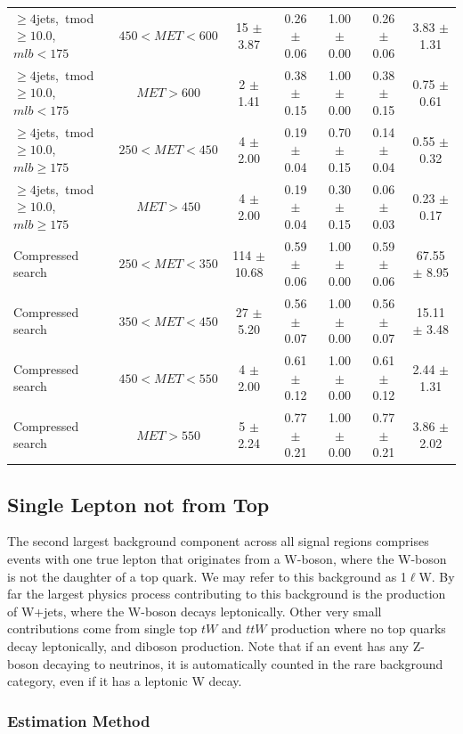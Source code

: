 \begin{table}
\begin{tabular}{|l|c|c|c|c|c|c|}
 $\ge4$jets,~tmod$\ge10.0$,~$mlb<175$ & $450<MET<600$  & 15 $\pm$ 3.87  & 0.26 $\pm$ 0.06  & 1.00 $\pm$ 0.00 & 0.26 $\pm$ 0.06  & 3.83 $\pm$ 1.31  \\
 $\ge4$jets,~tmod$\ge10.0$,~$mlb<175$ & $MET>600$  & 2 $\pm$ 1.41  & 0.38 $\pm$ 0.15  & 1.00 $\pm$ 0.00 & 0.38 $\pm$ 0.15  & 0.75 $\pm$ 0.61  \\
\hline
 $\ge4$jets,~tmod$\ge10.0$,~$mlb\ge175$ & $250<MET<450$  & 4 $\pm$ 2.00  & 0.19 $\pm$ 0.04  & 0.70 $\pm$ 0.15 & 0.14 $\pm$ 0.04  & 0.55 $\pm$ 0.32  \\
 $\ge4$jets,~tmod$\ge10.0$,~$mlb\ge175$ & $MET>450$  & 4 $\pm$ 2.00  & 0.19 $\pm$ 0.04  & 0.30 $\pm$ 0.15 & 0.06 $\pm$ 0.03  & 0.23 $\pm$ 0.17  \\
\hline
Compressed search & $250<MET<350$  & 114 $\pm$ 10.68  & 0.59 $\pm$ 0.06 & 1.00 $\pm$ 0.00 & 0.59 $\pm$ 0.06  & 67.55 $\pm$ 8.95  \\
Compressed search & $350<MET<450$  &  27 $\pm$ 5.20   & 0.56 $\pm$ 0.07 & 1.00 $\pm$ 0.00 & 0.56 $\pm$ 0.07  & 15.11 $\pm$ 3.48  \\
Compressed search & $450<MET<550$  &   4 $\pm$ 2.00   & 0.61 $\pm$ 0.12 & 1.00 $\pm$ 0.00 & 0.61 $\pm$ 0.12  &  2.44 $\pm$ 1.31  \\
Compressed search & $MET>550$      &   5 $\pm$ 2.24   & 0.77 $\pm$ 0.21 & 1.00 $\pm$ 0.00 & 0.77 $\pm$ 0.21  &  3.86 $\pm$ 2.02  \\
\hline
\end{tabular}
\end{table}

\subsection{Single Lepton not from Top}
\label{ssec:stop:1lw}

The second largest background component across all signal regions
comprises events with one true lepton that originates from a W-boson,
where the W-boson is not the daughter of a top quark. We may refer to
this background as 1$\ell$W. By far the
largest physics process contributing to this background is the
production of W+jets, where the W-boson decays leptonically. Other
very small contributions come from single top $tW$ and $ttW$
production where no top quarks decay leptonically, and diboson
production. Note that if an event has any Z-boson decaying to
neutrinos, it is automatically counted in the rare background
category, even if it has a leptonic W decay.

\subsubsection{Estimation Method}
\label{sssec:stop:1lw:estimation}

